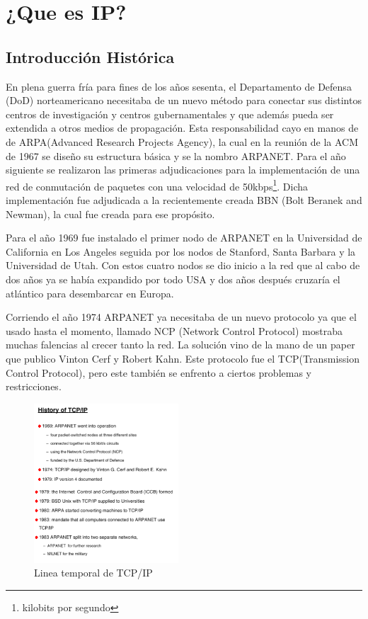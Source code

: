 \documentclass[11pt,a4paper]{article}
\author{Ignacio Perez Laborda -- Barbara Martinez}
\begin{document}


\tableofcontents
\newpage
\listoffigures

\newpage

\section{¿Que es IP?}
\subsection{Introducción Histórica}
En plena guerra fría para fines de los años sesenta, el Departamento de Defensa (DoD) norteamericano
necesitaba de un nuevo método para conectar sus distintos centros de investigación y centros 
gubernamentales y que además pueda ser extendida a otros medios de propagación. Esta responsabilidad 
cayo en manos de de ARPA(Advanced Research Projects Agency), la cual en la
reunión de la ACM de 1967 se diseño su estructura básica y se la nombro ARPANET. Para el año 
siguiente se realizaron las primeras adjudicaciones para la implementación de una red de conmutación
de paquetes con una velocidad de 50kbps\footnote{kilobits por segundo}. Dicha implementación fue
adjudicada a la recientemente creada BBN (Bolt Beranek and Newman), la cual fue creada para ese
propósito.\par
Para el año 1969 fue instalado el primer nodo de ARPANET en la Universidad de California en Los
Angeles seguida por los nodos de Stanford, Santa Barbara y la Universidad de Utah. Con estos cuatro
nodos se dio inicio a la red que al cabo de dos años ya se había expandido por todo USA y dos años
después cruzaría el atlántico para desembarcar en Europa.\par
Corriendo el año 1974 ARPANET ya necesitaba de un nuevo protocolo ya que el usado hasta el momento, 
llamado NCP (Network Control Protocol) mostraba muchas falencias al crecer tanto la red. La solución
vino de la mano de un paper que publico Vinton Cerf y Robert Kahn. Este protocolo fue el 
TCP(Transmission Control Protocol), pero este también se enfrento a ciertos problemas y 
restricciones.
\begin{figure}
\centering
  \includegraphics[width=0.48\textwidth]{historiaTCPIP.png}
 \caption[Historia de TCP/IP]{Linea temporal de TCP/IP}
\vspace{-15pt}
\end{figure}
\end{document}
